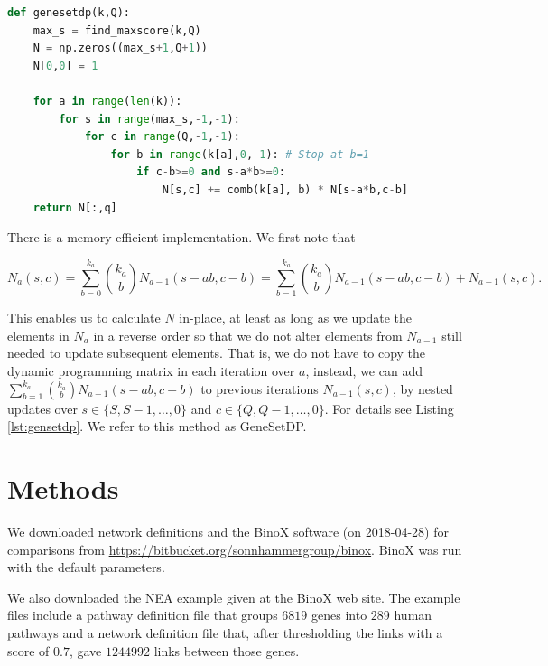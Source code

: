 \documentclass[10pt,letterpaper]{article}
\begin{document}
\begin{lstlisting}[language=Python, caption={ The central part of the dynamic programing algorithm for finding $N(s)$. The function takes the vector of links per gene, $k_a$, as well as the number of query genes, $Q$ as an input. The function depends on two additional functions {\tt find\_maxscore(k,Q)}, which calculates the maximal score a query of size $Q$ can obtain, and {\tt comb(a,b)}, which calculates $ a \choose b $.}, label=lst:gensetdp, captionpos=t, float, abovecaptionskip=-\medskipamount]
def genesetdp(k,Q):
    max_s = find_maxscore(k,Q)
    N = np.zeros((max_s+1,Q+1))
    N[0,0] = 1

    for a in range(len(k)):
        for s in range(max_s,-1,-1):
            for c in range(Q,-1,-1):
                for b in range(k[a],0,-1): # Stop at b=1
                    if c-b>=0 and s-a*b>=0:
                        N[s,c] += comb(k[a], b) * N[s-a*b,c-b]
    return N[:,q]
\end{lstlisting}

There is a memory efficient implementation. We first note that

\[
N_a(s,c)=\sum_{b=0}^{k_a}{k_a \choose b} N_{a-1}(s-ab,c-b)=\sum_{b=1}^{k_a}{k_a \choose b} N_{a-1}(s-ab,c-b) + N_{a-1}(s,c).
\]


This enables us to calculate $N$ in-place, at least as long as we update the elements in $N_a$ in a reverse order so that we do not alter elements from $N_{a-1}$ still needed to update subsequent elements. That is, we do not have to copy the dynamic programming matrix in each iteration over $a$, instead, we can add $\sum_{b=1}^{k_a}{k_a \choose b} N_{a-1}(s-ab,c-b)$ to previous iterations $N_{a-1}(s,c)$, by nested updates over $s \in \{ S, S-1, \ldots, 0 \}$ and $c \in \{ Q, Q-1, \ldots, 0 \}$. For details see Listing \ref{lst:gensetdp}. We refer to this method as GeneSetDP.

\section*{Methods}

We downloaded network definitions and the BinoX software (on 2018-04-28) for comparisons from \url{https://bitbucket.org/sonnhammergroup/binox}. BinoX was run with the default parameters.

We also downloaded the NEA example given at the BinoX web site. The example files include a pathway definition file that groups $6819$ genes into $289$ human pathways and a network definition file that, after thresholding the links with a score of $0.7$, gave $1244992$ links between those genes.
\end{document}
